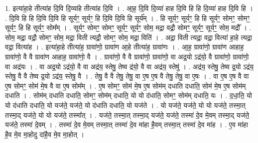 \documentclass[17pt]{extarticle}
\begin{document}
1. इत्या॑हा॒हे तीत्या॑ह दि॒वि दि॒व्या॑हे तीत्या॑ह दि॒वि । . आ॒ह॒ दि॒वि दि॒व्या॑ हाह दि॒वि हि हि दि॒व्या॑ हाह दि॒वि हि । . दि॒वि हि हि दि॒वि दि॒वि हि सूर्यꣳ॒॒ सूर्यꣳ॒॒ हि दि॒वि दि॒वि हि सूर्य᳚म् । . हि सूर्यꣳ॒॒ सूर्यꣳ॒॒ हि हि सूर्यꣳ॒॒ सोमꣳ॒॒ सोमꣳ॒॒ सूर्यꣳ॒॒ हि हि सूर्यꣳ॒॒ सोम᳚म् । . सूर्यꣳ॒॒ सोमꣳ॒॒ सोमꣳ॒॒ सूर्यꣳ॒॒ सूर्यꣳ॒॒ सोम॒ मद्रा॒ वद्रौ॒ सोमꣳ॒॒ सूर्यꣳ॒॒ सूर्यꣳ॒॒ सोम॒ मद्रौ᳚ । . सोम॒ मद्रा॒ वद्रौ॒ सोमꣳ॒॒ सोम॒ मद्रा॒ विती त्यद्रौ॒ सोमꣳ॒॒ सोम॒ मद्रा॒ विति॑ । . अद्रा॒ विती त्यद्रा॒ वद्रा॒ वित्या॑ हा॒हे त्यद्रा॒ वद्रा॒ वित्या॑ह । . इत्या॑हा॒हे तीत्या॑ह॒ ग्रावा॑णो॒ ग्रावा॑ण आ॒हे तीत्या॑ह॒ ग्रावा॑णः । . आ॒ह॒ ग्रावा॑णो॒ ग्रावा॑ण आहाह॒ ग्रावा॑णो॒ वै वै ग्रावा॑ण आहाह॒ ग्रावा॑णो॒ वै । . ग्रावा॑णो॒ वै वै ग्रावा॑णो॒ ग्रावा॑णो॒ वा अद्र॒यो ऽद्र॑यो॒ वै ग्रावा॑णो॒ ग्रावा॑णो॒ वा अद्र॑यः । . वा अद्र॒यो ऽद्र॑यो॒ वै वा अद्र॑य॒ स्तेषु॒ तेष्व द्र॑यो॒ वै वा अद्र॑य॒ स्तेषु॑ । . अद्र॑य॒ स्तेषु॒ तेष्व द्र॒यो ऽद्र॑य॒ स्तेषु॒ वै वै तेष्व द्र॒यो ऽद्र॑य॒ स्तेषु॒ वै । . तेषु॒ वै वै तेषु॒ तेषु॒ वा ए॒ष ए॒ष वै तेषु॒ तेषु॒ वा ए॒षः । . वा ए॒ष ए॒ष वै वा ए॒ष सोमꣳ॒॒ सोम॑ मे॒ष वै वा ए॒ष सोम᳚म् । . ए॒ष सोमꣳ॒॒ सोम॑ मे॒ष ए॒ष सोम॑म् दधाति दधाति॒ सोम॑ मे॒ष ए॒ष सोम॑म् दधाति । . सोम॑म् दधाति दधाति॒ सोमꣳ॒॒ सोम॑म् दधाति॒ यो यो द॑धाति॒ सोमꣳ॒॒ सोम॑म् दधाति॒ यः । . द॒धा॒ति॒ यो यो द॑धाति दधाति॒ यो यज॑ते॒ यज॑ते॒ यो द॑धाति दधाति॒ यो यज॑ते । . यो यज॑ते॒ यज॑ते॒ यो यो यज॑ते॒ तस्मा॒त् तस्मा॒द् यज॑ते॒ यो यो यज॑ते॒ तस्मा᳚त् । . यज॑ते॒ तस्मा॒त् तस्मा॒द् यज॑ते॒ यज॑ते॒ तस्मा॑ दे॒व मे॒वम् तस्मा॒द् यज॑ते॒ यज॑ते॒ तस्मा॑ दे॒वम् । . तस्मा॑ दे॒व मे॒वम् तस्मा॒त् तस्मा॑ दे॒व मा॑हा है॒वम् तस्मा॒त् तस्मा॑ दे॒व मा॑ह । . ए॒व मा॑हा है॒व मे॒व मा॒होदु दा॑है॒व मे॒व मा॒होत् । \newline
\end{document}

